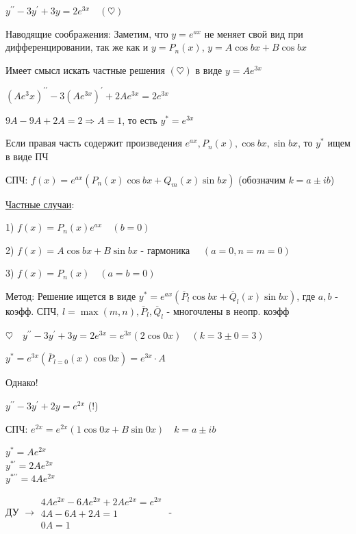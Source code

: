 \documentclass[12pt]{article}
\begin{document}
    \Ex $y^{\prime\prime} - 3y^\prime + 3y = 2e^{3x} \quad (\heartsuit)$

    Наводящие соображения: Заметим, что $y = e^{ax}$ не меняет свой вид при дифференцировании,
    так же как и $y = P_n(x)$, $y = A\cos bx + B\cos bx$

    Имеет смысл искать частные решения $(\heartsuit)$ в виде $y = Ae^{3x}$

    $(Ae^3x)^{\prime\prime} - 3(Ae^{3x})^\prime + 2Ae^{3x} = 2e^{3x}$

    $9A - 9A + 2A = 2 \Longrightarrow A = 1$, то есть $y^* = e^{3x}$

    \Nota Если правая часть содержит произведения $e^{ax}, P_n(x), \cos bx, \sin bx$, то $y^*$ ищем в виде ПЧ

    \Def СПЧ: $f(x) = e^{ax} (P_n(x)\cos bx + Q_m (x)\sin bx)$ (обозначим $k = a \pm ib$)

    \underline{Частные случаи}:

    1) $f(x) = P_n(x) e^{ax} \quad (b = 0)$

    2) $f(x) = A\cos b x + B \sin bx$ - гармоника $\quad (a = 0, n = m = 0)$

    3) $f(x) = P_n(x) \quad (a = b = 0)$

    Метод: Решение ищется в виде $y^* = e^{ax} (\overline{P}_l \cos bx + \overline{Q}_l (x) \sin bx)$,
    где $a, b$ - коэфф. СПЧ, $l = \max(m, n), \overline{P}_l, \overline{Q}_l$ - многочлены в неопр. коэфф

     $\heartsuit \quad y^{\prime\prime} - 3y^\prime + 3y = 2e^{3x} = e^{3x} (2 \cos 0x) \quad (k = 3 \pm 0 = 3)$

    $y^* = e^{3x} (\overline{P}_{l = 0} (x) \cos 0x) = e^{3x} \cdot A$

     Однако!

    $y^{\prime\prime} - 3y^\prime + 2y = e^{2x}$ (!)

    СПЧ: $e^{2x} = e^{2x} (1 \cos 0x + B \sin 0x) \quad k = a \pm ib$

    \begin{rcases*}
    $y^* = Ae^{2x}$ \\

    $y^{*\prime} = 2Ae^{2x}$ \\

    $y^{*\prime\prime} = 4Ae^{2x}$ \\
    \end{rcases*} ДУ $\longrightarrow \begin{matrix}4Ae^{2x} - 6Ae^{2x} + 2Ae^{2x} = e^{2x} \\ 4A - 6A + 2A = 1 \\ 0A = 1\end{matrix}$ - {\Huge 🤯}
\end{document}
